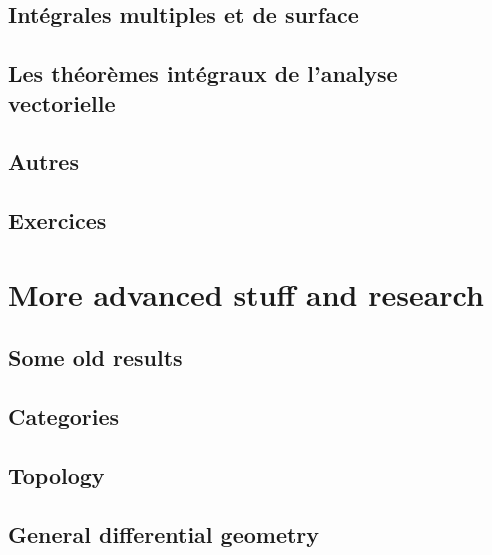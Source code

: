 \documentclass[a4paper,twoside,11pt]{book}
\begin{document}
\chapter{Intégrales multiples et de surface}


\chapter{Les théorèmes intégraux de l'analyse vectorielle}


\chapter{Autres}


\chapter{Exercices}



\emptyInputPath
{}

\part{More advanced stuff and research}



\chapter{Some old results}


\chapter{Categories}        \label{chap_category}


\chapter{Topology}              \label{chap_topology}



\chapter{General differential geometry} \label{Chapitre_FB}

 
\end{document}
